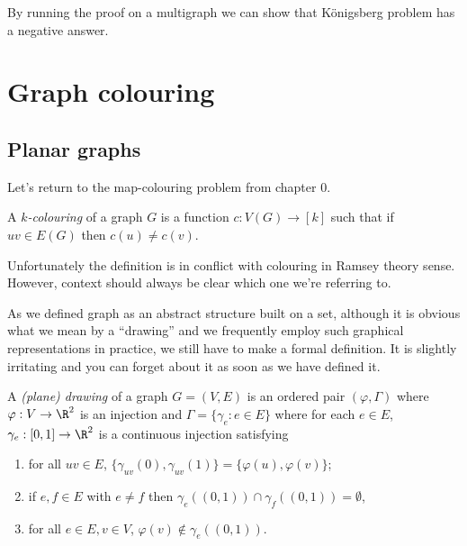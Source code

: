 \documentclass[a4paper]{article}
\begin{document}
By running the proof on a multigraph we can show that Königsberg problem has a negative answer.

\section{Graph colouring}

\subsection{Planar graphs}

Let's return to the map-colouring problem from chapter 0.

\begin{definition}[colouring]
  A \emph{\(k\)-colouring} of a graph \(G\) is a function \(c: V(G) \to [k]\) such that if \(uv \in E(G)\) then \(c(u) \neq c(v)\).
\end{definition}

\begin{note}
  Unfortunately the definition is in conflict with colouring in Ramsey theory sense. However, context should always be clear which one we're referring to.
\end{note}

As we defined graph as an abstract structure built on a set, although it is obvious what we mean by a ``drawing'' and we frequently employ such graphical representations in practice, we still have to make a formal definition. It is slightly irritating and you can forget about it as soon as we have defined it.

\begin{definition}[drawing]
  A \emph{(plane) drawing} of a graph \(G = (V, E)\) is an ordered pair \((\varphi, \Gamma)\) where \(\varphi: V \to \R^2\) is an injection and \(\Gamma = \{\gamma_e: e \in E\}\) where for each \(e \in E\), \(\gamma_e: [0, 1] \to \R^2\) is a continuous injection satisfying
  \begin{enumerate}
  \item for all \(uv \in E\), \(\{\gamma_{uv}(0), \gamma_{uv}(1)\} = \{\varphi(u), \varphi(v)\}\);
  \item if \(e, f \in E\) with \(e \neq f\) then \(\gamma_e((0, 1)) \cap \gamma_f((0, 1)) = \emptyset\),
  \item for all \(e \in E, v \in V\), \(\varphi(v) \notin \gamma_e((0, 1))\).
  \end{enumerate}
\end{definition}
\end{document}
